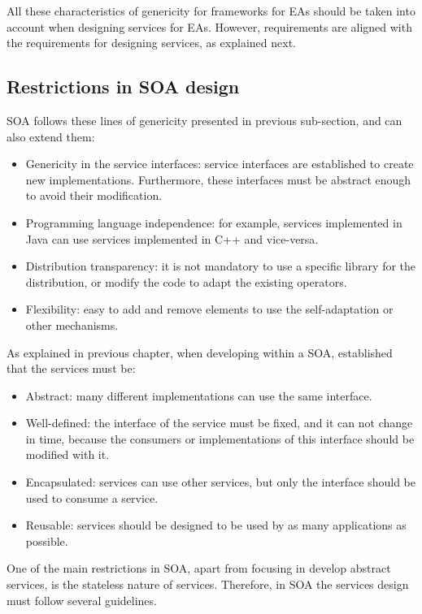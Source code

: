 All these characteristics of genericity for frameworks for EAs should be taken into account when designing services for EAs. However, requirements are aligned with the requirements for designing services, as explained next.

\subsection{Restrictions in SOA design}

SOA follows these lines of genericity presented in previous sub-section, and can also extend them:
\begin{itemize}
\item Genericity in the service interfaces: service interfaces are established to create new implementations. Furthermore, these interfaces must be abstract enough to avoid their modification.
\item Programming language independence: for example, services implemented in Java can use services implemented in C++ and vice-versa.
\item Distribution transparency: it is not mandatory to use a specific library for the distribution, or modify the code to adapt the existing operators.
\item Flexibility: easy to add and remove elements to use the self-adaptation or other mechanisms.
\end{itemize}

As explained in previous chapter, when developing within a SOA,  \cite{Papazoglou2007SOA} established that the services must be: 
\begin{itemize}
\item Abstract: many different implementations can use the same interface.
\item Well-defined: the interface of the service must be fixed, and it can not change in time, because the consumers or implementations of this interface should be modified with it.
\item Encapsulated: services can use other services, but only the interface should be used to consume a service.
\item Reusable: services should be designed to be used by as many applications as possible. 
\end{itemize}

One of the main restrictions in SOA, apart from focusing in develop abstract services, is the stateless nature of services. Therefore, in SOA the services design must follow several guidelines.

